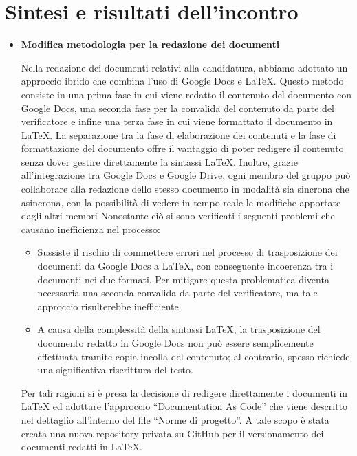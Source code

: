 \documentclass{article}
\begin{document}
\section*{\textbf{Sintesi e risultati dell’incontro}}

\begin{itemize}
  \item \textbf{\fontsize{12}{6}\selectfont Modifica metodologia per la redazione dei documenti}
  
  Nella redazione dei documenti relativi alla candidatura, abbiamo adottato un approccio ibrido che combina l'uso di Google Docs e LaTeX. Questo metodo consiste in una prima fase in cui viene redatto il contenuto del documento con Google Docs, una seconda fase per la convalida del contenuto da parte del verificatore e infine una terza fase in cui viene formattato il documento in LaTeX.
  La separazione tra la fase di elaborazione dei contenuti e la fase di formattazione del documento offre il vantaggio di poter redigere il contenuto senza dover gestire direttamente la sintassi LaTeX. Inoltre, grazie all’integrazione tra Google Docs e Google Drive, ogni membro del gruppo può collaborare alla redazione dello stesso documento in modalità sia sincrona che asincrona, con la possibilità di vedere in tempo reale le modifiche apportate dagli altri membri
  Nonostante ciò si sono verificati i seguenti problemi che causano inefficienza nel processo:
  \begin{itemize}
    \item Sussiste il rischio di commettere errori nel processo di trasposizione dei documenti da Google Docs a LaTeX, con conseguente incoerenza tra i documenti nei due formati. Per mitigare questa problematica diventa necessaria una seconda convalida da parte del verificatore, ma tale approccio risulterebbe inefficiente.
    \item A causa della complessità della sintassi LaTeX, la trasposizione del documento redatto in Google Docs non può essere semplicemente effettuata tramite copia-incolla del contenuto; al contrario, spesso richiede una significativa riscrittura del testo.
  \end{itemize}
  Per tali ragioni si è presa la decisione di redigere direttamente i documenti in LaTeX ed adottare l’approccio “Documentation As Code” che viene descritto nel dettaglio all’interno del file “Norme di progetto”. A tale scopo è stata creata una nuova repository privata su GitHub per il versionamento dei documenti redatti in LaTeX.
    \vspace{0.5cm}
  

\end{itemize}
\end{document}
